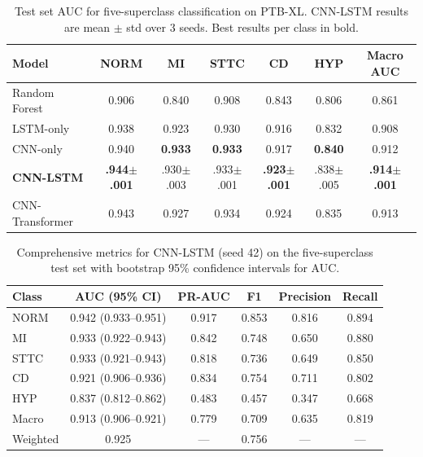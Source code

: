 \documentclass[10pt]{article}
\begin{document}
\begin{table}[t]
\caption{Test set AUC for five-superclass classification on PTB-XL. CNN-LSTM results are mean $\pm$ std over 3 seeds. Best results per class in bold.}
\label{tab:main_results}
\begin{center}
\begin{tabular}{lcccccc}
\toprule
Model & NORM & MI & STTC & CD & HYP & Macro AUC \\
\midrule
Random Forest & 0.906 & 0.840 & 0.908 & 0.843 & 0.806 & 0.861 \\
LSTM-only & 0.938 & 0.923 & 0.930 & 0.916 & 0.832 & 0.908 \\
CNN-only & 0.940 & \textbf{0.933} & \textbf{0.933} & 0.917 & \textbf{0.840} & 0.912 \\
\textbf{CNN-LSTM} & \textbf{.944\tiny{$\pm$.001}} & .930\tiny{$\pm$.003} & .933\tiny{$\pm$.001} & \textbf{.923\tiny{$\pm$.001}} & .838\tiny{$\pm$.005} & \textbf{.914\tiny{$\pm$.001}} \\
CNN-Transformer & 0.943 & 0.927 & 0.934 & 0.924 & 0.835 & 0.913 \\
\bottomrule
\end{tabular}
\end{center}
\end{table}

\begin{table}[t]
\caption{Comprehensive metrics for CNN-LSTM (seed 42) on the five-superclass test set with bootstrap 95\% confidence intervals for AUC.}
\label{tab:full_metrics}
\begin{center}
\small
\begin{tabular}{lccccc}
\toprule
Class & AUC (95\% CI) & PR-AUC & F1 & Precision & Recall \\
\midrule
NORM & 0.942 (0.933--0.951) & 0.917 & 0.853 & 0.816 & 0.894 \\
MI & 0.933 (0.922--0.943) & 0.842 & 0.748 & 0.650 & 0.880 \\
STTC & 0.933 (0.921--0.943) & 0.818 & 0.736 & 0.649 & 0.850 \\
CD & 0.921 (0.906--0.936) & 0.834 & 0.754 & 0.711 & 0.802 \\
HYP & 0.837 (0.812--0.862) & 0.483 & 0.457 & 0.347 & 0.668 \\
\midrule
Macro & 0.913 (0.906--0.921) & 0.779 & 0.709 & 0.635 & 0.819 \\
Weighted & 0.925 & --- & 0.756 & --- & --- \\
\bottomrule
\end{tabular}
\end{center}
\end{table}
\end{document}
